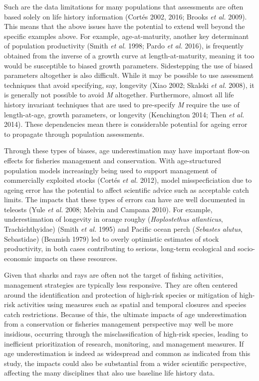 \documentclass[]{article}
\begin{document}
Such are the data limitations for many populations that assessments are
often based solely on life history information (Cortés 2002, 2016;
Brooks \emph{et al.} 2009). This means that the above issues have the
potential to extend well beyond the specific examples above. For
example, age-at-maturity, another key determinant of population
productivity (Smith \emph{et al.} 1998; Pardo \emph{et al.} 2016), is
frequently obtained from the inverse of a growth curve at
length-at-maturity, meaning it too would be susceptible to biased growth
parameters. Sidestepping the use of biased parameters altogether is also
difficult. While it may be possible to use assessment techniques that
avoid specifying, say, longevity (Xiao 2002; Skalski \emph{et al.}
2008), it is generally not possible to avoid \emph{M} altogether.
Furthermore, almost all life history invariant techniques that are used
to pre-specify \emph{M} require the use of length-at-age, growth
parameters, or longevity (Kenchington 2014; Then \emph{et al.} 2014).
These dependencies mean there is considerable potential for ageing error
to propagate through population assessments.

Through these types of biases, age underestimation may have important
flow-on effects for fisheries management and conservation. With
age-structured population models increasingly being used to support
management of commercially exploited stocks (Cortés \emph{et al.} 2012),
model misspecficiation due to ageing error has the potential to affect
scientific advice such as acceptable catch limits. The impacts that
these types of errors can have are well documented in teleosts (Yule
\emph{et al.} 2008; Melvin and Campana 2010). For example,
underestimation of longevity in orange roughy (\emph{Hoplostethus
atlanticus}, Trachichthyidae) (Smith \emph{et al.} 1995) and Pacific
ocean perch (\emph{Sebastes alutus}, Sebastidae) (Beamish 1979) led to
overly optimistic estimates of stock productivity, in both cases
contributing to serious, long-term ecological and socio-economic impacts
on these resources.

Given that sharks and rays are often not the target of fishing
activities, management strategies are typically less responsive. They
are often centered around the identification and protection of high-risk
species or mitigation of high-risk activities using measures such as
spatial and temporal closures and species catch restrictions. Because of
this, the ultimate impacts of age underestimation from a conservation or
fisheries management perspective may well be more insidious, occurring
through the misclassification of high-risk species, leading to
inefficient prioritization of research, monitoring, and management
measures. If age underestimation is indeed as widespread and common as
indicated from this study, the impacts could also be substantial from a
wider scientific perspective, affecting the many disciplines that also
use baseline life history data.
\end{document}

